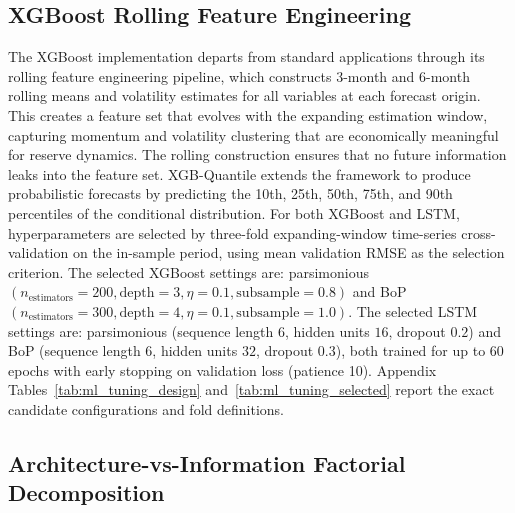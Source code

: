 \documentclass[12pt,a4paper]{article}
\begin{document}
\subsection{XGBoost Rolling Feature Engineering}

The XGBoost implementation departs from standard applications through its rolling feature engineering pipeline, which constructs 3-month and 6-month rolling means and volatility estimates for all variables at each forecast origin. This creates a feature set that evolves with the expanding estimation window, capturing momentum and volatility clustering that are economically meaningful for reserve dynamics. The rolling construction ensures that no future information leaks into the feature set. XGB-Quantile extends the framework to produce probabilistic forecasts by predicting the 10th, 25th, 50th, 75th, and 90th percentiles of the conditional distribution. For both XGBoost and LSTM, hyperparameters are selected by three-fold expanding-window time-series cross-validation on the in-sample period, using mean validation RMSE as the selection criterion. The selected XGBoost settings are: parsimonious $(n_{\text{estimators}} = 200, \text{depth} = 3, \eta = 0.1, \text{subsample} = 0.8)$ and BoP $(n_{\text{estimators}} = 300, \text{depth} = 4, \eta = 0.1, \text{subsample} = 1.0)$. The selected LSTM settings are: parsimonious (sequence length $6$, hidden units $16$, dropout $0.2$) and BoP (sequence length $6$, hidden units $32$, dropout $0.3$), both trained for up to 60 epochs with early stopping on validation loss (patience 10). Appendix Tables~\ref{tab:ml_tuning_design} and~\ref{tab:ml_tuning_selected} report the exact candidate configurations and fold definitions.

\subsection{Architecture-vs-Information Factorial Decomposition}
\end{document}
